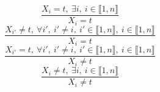 $$\frac{X_{i}=t,~\exists i,~i \in \llbracket1,n\rrbracket}{X_{i}=t}$$ $$\frac{X_{i'} \neq t,~\forall i',~i' \neq i,~i' \in \llbracket1,n\rrbracket,~i \in \llbracket1,n\rrbracket}{X_{i}=t}$$ $$\frac{X_{i'}=t,~\forall i',~i' \neq i,~i' \in \llbracket1,n\rrbracket,~i \in \llbracket1,n\rrbracket}{X_{i} \neq t}$$ $$\frac{X_{i} \neq t,~\exists i,~i \in \llbracket1,n\rrbracket}{X_{i} \neq t}$$ 
